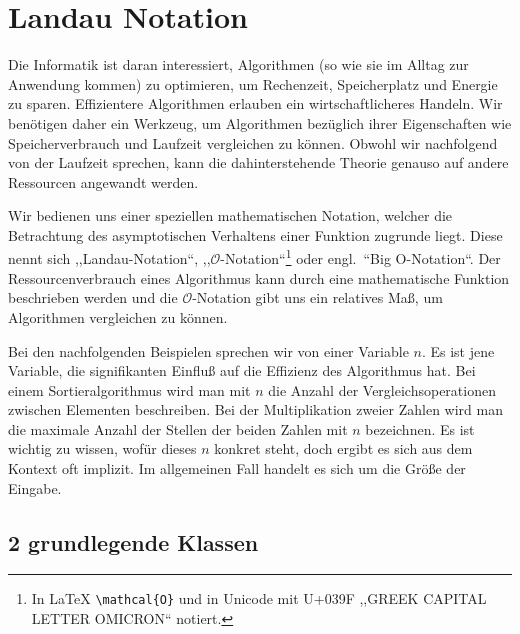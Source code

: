 \chapter{Landau Notation}
\label{sec:bigoh}
%
Die Informatik ist daran interessiert, Algorithmen (so wie sie im Alltag zur Anwendung kommen) zu optimieren, um Rechenzeit, Speicherplatz und Energie zu sparen. Effizientere Algorithmen erlauben ein wirtschaftlicheres Handeln. Wir benötigen daher ein Werkzeug, um Algorithmen bezüglich ihrer Eigenschaften wie Speicherverbrauch und Laufzeit vergleichen zu können. Obwohl wir nachfolgend von der Laufzeit sprechen, kann die dahinterstehende Theorie genauso auf andere Ressourcen angewandt werden.

Wir bedienen uns einer speziellen mathematischen Notation, welcher die Betrachtung des asymptotischen Verhaltens einer Funktion zugrunde liegt. Diese nennt sich ,,Landau-Notation``, ,,$\mathcal{O}$-Notation``\footnote{In \LaTeX{}  \texttt{\textbackslash mathcal\{O\}} und in Unicode mit U+039F ,,GREEK CAPITAL LETTER OMICRON`` notiert.} oder engl.~``Big O-Notation``. Der Ressourcenverbrauch eines Algorithmus kann durch eine mathematische Funktion beschrieben werden und die $\mathcal{O}$-Notation gibt uns ein relatives Maß, um Algorithmen vergleichen zu können.

Bei den nachfolgenden Beispielen sprechen wir von einer Variable $n$. Es ist jene Variable, die signifikanten Einfluß auf die Effizienz des Algorithmus hat. Bei einem Sortieralgorithmus wird man mit $n$ die Anzahl der Vergleichsoperationen zwischen Elementen beschreiben. Bei der Multiplikation zweier Zahlen wird man die maximale Anzahl der Stellen der beiden Zahlen mit $n$ bezeichnen. Es ist wichtig zu wissen, wofür dieses $n$ konkret steht, doch ergibt es sich aus dem Kontext oft implizit. Im allgemeinen Fall handelt es sich um die Größe der Eingabe.
%
\section{2 grundlegende Klassen}
